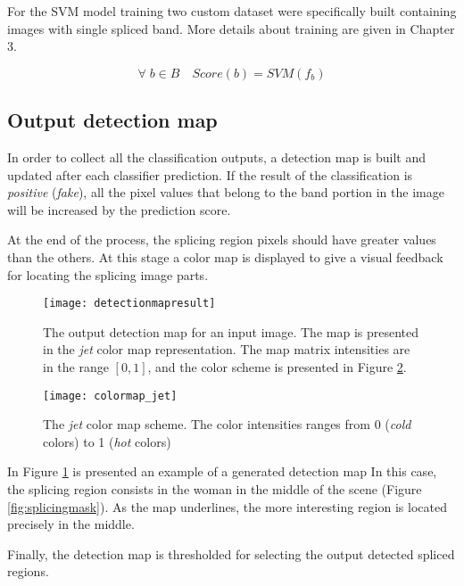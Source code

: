 For the SVM model training two custom dataset were specifically built containing images with single spliced band. More details about training are given in Chapter 3. 

$$
\forall \; b \in B \quad Score(b) = SVM(f_b)
$$

\subsection{Output detection map}

In order to collect all the classification outputs, a detection map is built and updated after each classifier prediction. If the result of the classification is \emph{positive} (\emph{fake}), all the pixel values that belong to the band portion in the image will be increased by the prediction score.

At the end of the process, the splicing region pixels should have greater values than the others. At this stage a color map is displayed to give a visual feedback for locating the splicing image parts.

\begin{figure}[h!]
  \centering
    \texttt{[image: detectionmapresult]}
    \caption{The output detection map for an input image. The map is presented in the \emph{jet} color map representation. The map matrix intensities are in the range $[0, 1]$, and the color scheme is presented in Figure \ref{fig:colormapjet}.}\label{fig:regionsdetectionmap}
\end{figure}

\begin{figure}[h!]
  \centering
    \texttt{[image: colormap\_jet]}
    \caption{The \emph{jet} color map scheme. The color intensities ranges from 0 (\emph{cold} colors) to 1 (\emph{hot} colors)}
    \label{fig:colormapjet}
\end{figure}

In Figure \ref{fig:regionsdetectionmap} is presented an example of a generated detection map In this case, the splicing region consists in the woman in the middle of the scene (Figure \ref{fig:splicingmask}). As the map underlines, the more interesting region is located precisely in the middle.

Finally, the detection map is thresholded for selecting the output detected spliced regions.



